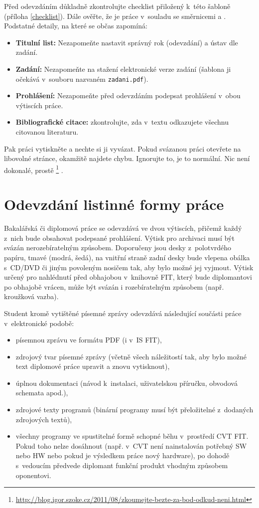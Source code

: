 Před odevzdáním důkladně zkontrolujte checklist přiložený k~této šabloně (příloha \ref{checklist}). Dále ověřte, že je práce v~souladu se směrnicemi \cite{smernice} a \cite{smerniceFIT}. Podstatné detaily, na které se občas zapomíná:
\begin{itemize}
	\item \textbf{Titulní list:} Nezapomeňte nastavit správný rok (odevzdání) a ústav dle zadání.
    \item \textbf{Zadání:} Nezapomeňte na stažení elektronické verze zadání (šablona ji očekává v~souboru nazvaném \texttt{zadani.pdf}). 
    \item \textbf{Prohlášení:} Nezapomeňte před odevzdáním podepsat prohlášení v~obou výtiscích práce.
    \item \textbf{Bibliografické citace:} zkontrolujte, zda v~textu odkazujete všechnu citovanou literaturu.
\end{itemize}

Pak práci vytiskněte a nechte si ji vyvázat. Pokud svázanou práci otevřete na libovolné stránce, okamžitě najdete chybu. Ignorujte to, je to normální. Nic není dokonalé, prostě \footnote{\url{http://blog.igor.szoke.cz/2011/08/zkoumejte-bezte-za-bod-odkud-neni.html}} \cite{rady}.


\section{Odevzdání listinné formy práce}

Bakalářská či diplomová práce se odevzdává ve dvou výtiscích, přičemž každý z~nich bude obsahovat podepsané prohlášení. Výtisk pro archivaci musí být svázán nerozebíratelným způsobem. Doporučeny jsou desky z~polotvrdého papíru, tmavé (modrá, šedá), na vnitřní straně zadní desky bude vlepena obálka s~CD/DVD či jiným povoleným nosičem tak, aby bylo možné jej vyjmout. Výtisk určený pro nahlédnutí před obhajobou v~knihovně FIT, který bude diplomantovi po obhajobě vrácen, může být svázán i rozebíratelným způsobem (např. kroužková vazba).

Student kromě vytištěné písemné zprávy odevzdává následující součásti práce v~elektronické podobě:
\begin{itemize}
  \item{písemnou zprávu ve formátu PDF (i v~IS FIT),}
  \item{zdrojový tvar písemné zprávy (včetně všech náležitostí tak, aby bylo možné text diplomové práce upravit a znovu vytisknout),}
  \item{úplnou dokumentaci (návod k~instalaci, uživatelskou příručku, obvodová schemata apod.),}
  \item{zdrojové texty programů (binární programy musí být přeložitelné z~dodaných zdrojových textů),}
  \item{všechny programy ve spustitelné formě schopné běhu v~prostředí CVT FIT. Pokud toho nelze dosáhnout (např. v~CVT není nainstalován potřebný SW nebo HW nebo pokud je výsledkem práce nový hardware), po dohodě s~vedoucím předvede diplomant funkční produkt vhodným způsobem oponentovi.}
\end{itemize}


